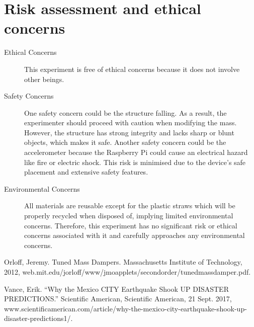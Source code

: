 \documentclass{article}
\begin{document}
\section{Risk assessment and ethical concerns}
\begin{description}
    \item[Ethical Concerns] This experiment is free of ethical concerns because it does not involve other beings.
    \item[Safety Concerns] One safety concern could be the structure falling. As a result, the experimenter should proceed with caution when modifying the mass. However, the structure has strong integrity and lacks sharp or blunt objects, which makes it safe. Another safety concern could be the accelerometer because the Raspberry Pi could cause an electrical hazard like fire or electric shock. This risk is minimised due to the device's safe placement and extensive safety features. 
    \item[Environmental Concerns] All materials are reusable except for the plastic straws which will be properly recycled when disposed of, implying limited environmental concerns. Therefore, this experiment has no significant risk or ethical concerns associated with it and carefully approaches any environmental concerns.
\end{description}





\newpage

\begin{thebibliography}{1}

 Orloff, Jeremy. Tuned Mass Dampers. Massachusetts Institute of Technology, 2012, web.mit.edu/jorloff/www/jmoapplets/secondorder/tunedmassdamper.pdf.

 Vance, Erik. “Why the Mexico CITY Earthquake Shook UP DISASTER PREDICTIONS.” Scientific American, Scientific American, 21 Sept. 2017, www.scientificamerican.com/article/why-the-mexico-city-earthquake-shook-up-disaster-predictions1/.

\end{thebibliography}
\end{document}
